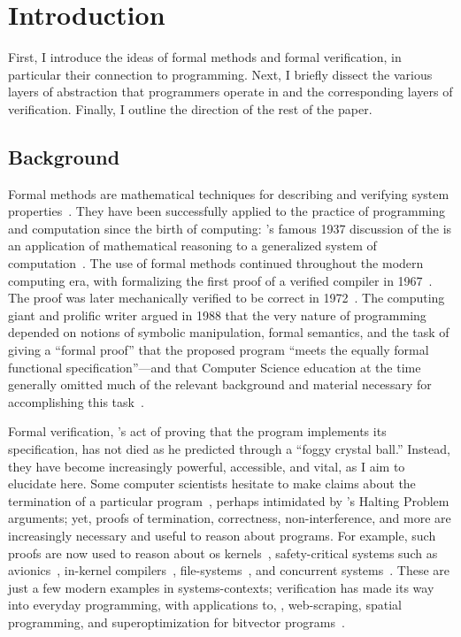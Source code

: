 \section{Introduction}

First, I introduce the ideas of formal methods and formal verification, in
particular their connection to programming. Next, I briefly dissect the various
layers of abstraction that programmers operate in and the corresponding
layers of verification. Finally, I outline the direction of the rest of the
paper.

\subsection{Background}

Formal methods are mathematical techniques for describing and verifying system
properties~\cite{Wing_90}. They have been successfully applied to the practice
of programming and computation since the birth of computing:
\citeauthor{Turing_1937}'s famous 1937 discussion of the {\haltprob} is an
application of mathematical reasoning to a generalized system of
computation~\cite{Turing_1937}. The use of formal methods continued throughout
the modern computing era, with \citeauthor{McCarthy_67} formalizing the first
proof of a verified compiler in 1967~\cite{McCarthy_67}. The proof was later
mechanically verified to be correct in 1972~\cite{Milner_72}. The computing
giant and prolific writer \citeauthor{EWD:EWD1036} argued in 1988 that the very
nature of programming depended on notions of symbolic manipulation, formal
semantics, and the task of giving a ``formal proof'' that the proposed program
``meets the equally formal functional specification''---and that Computer
Science education at the time generally omitted much of the relevant background
and material necessary for accomplishing this task~\cite{EWD:EWD1036}.

Formal verification, \citeauthor{EWD:EWD1036}'s act of proving that the program
implements its specification, has not died as he predicted through a ``foggy
crystal ball.'' Instead, they have become increasingly powerful, accessible, and
vital, as I aim to elucidate here. Some computer scientists hesitate to make
claims about the termination of a particular program~\cite{Cook_2011}, perhaps
intimidated by \citeauthor{Turing_1937}'s Halting Problem arguments; yet, proofs
of termination, correctness, non-interference, and more are increasingly
necessary and useful to reason about programs. For example, such proofs are now
used to reason about \gls{os}
kernels~\cite{Klein_EHACDEEKNSTW_09,Klein_AEHCDEEKNSTW_10,Klein_AEMSKH_14,Sewell_KH_16,Narayanan_2019,Narayan_2020,Nelson_2017},
safety-critical systems such as avionics~\cite[\S 1]{Leroy-Compcert-CACM},
in-kernel compilers~\cite{186144,258848}, file-systems~\cite{Zou_2019}, and
concurrent systems~\cite{222565,222621}. These are just a few modern examples in
systems-contexts; verification has made its way into everyday programming, with
applications to, \eg, web-scraping, spatial programming, and superoptimization
for bitvector programs~\cite[\S 4]{Torlak_2013}.

